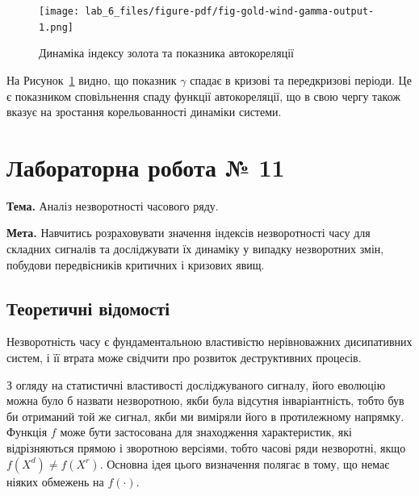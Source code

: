 \documentclass[
  letterpaper,
]{report}
\begin{document}
\begin{figure}[H]

{\centering \texttt{[image: lab\_6\_files/figure-pdf/fig-gold-wind-gamma-output-1.png]}

}

\caption{\label{fig-gold-wind-gamma}Динаміка індексу золота та показника
автокореляції}

\end{figure}

На Рисунок~\ref{fig-gold-wind-gamma} видно, що показник \(\gamma\)
спадає в кризові та передкризові періоди. Це є показником сповільнення
спаду функції автокореляції, що в свою чергу також вказує на зростання
корельованності динаміки системи.


\hypertarget{ux43bux430ux431ux43eux440ux430ux442ux43eux440ux43dux430-ux440ux43eux431ux43eux442ux430-11}{%
\chapter{Лабораторна робота №
11}\label{ux43bux430ux431ux43eux440ux430ux442ux43eux440ux43dux430-ux440ux43eux431ux43eux442ux430-11}}

\textbf{Тема.} Аналіз незворотності часового ряду.

\textbf{Мета.} Навчитись розраховувати значення індексів незворотності
часу для складних сигналів та досліджувати їх динаміку у випадку
незворотних змін, побудови передвісників критичних і кризових явищ.

\hypertarget{ux442ux435ux43eux440ux435ux442ux438ux447ux43dux456-ux432ux456ux434ux43eux43cux43eux441ux442ux456-6}{%
\section{Теоретичні
відомості}\label{ux442ux435ux43eux440ux435ux442ux438ux447ux43dux456-ux432ux456ux434ux43eux43cux43eux441ux442ux456-6}}

Незворотність часу є фундаментальною властивістю нерівноважних
дисипативних систем, і її втрата може свідчити про розвиток
деструктивних процесів.

З огляду на статистичні властивості досліджуваного сигналу, його
еволюцію можна було б назвати незворотною, якби була відсутня
інваріантність, тобто був би отриманий той же сигнал, якби ми виміряли
його в протилежному напрямку. Функція \(f\) може бути застосована для
знаходження характеристик, які відрізняються прямою і зворотною
версіями, тобто часові ряди незворотні, якщо \(f(X^d) \neq f(X^r)\).
Основна ідея цього визначення полягає в тому, що немає ніяких обмежень
на \(f(\cdot )\).
\end{document}
